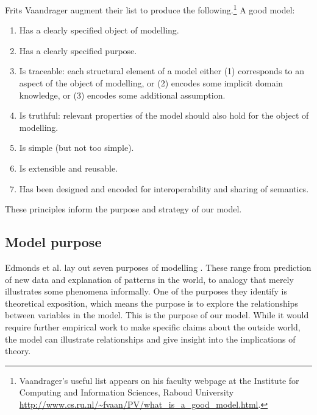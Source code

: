 Frits Vaandrager %
augment their list to produce the following.\footnote{Vaandrager's useful list appears on his faculty webpage at the Institute for Computing and Information Sciences, Raboud University \url{http://www.cs.ru.nl/~fvaan/PV/what_is_a_good_model.html}. %
} A good model: \begin{enumerate}
     \item Has a clearly specified object of modelling.
     \item Has a clearly specified purpose.
     \item Is traceable: each structural element of a model either (1) corresponds to an aspect of the object of modelling, or (2) encodes some implicit domain knowledge, or (3) encodes some additional assumption.
     \item Is truthful: relevant properties of the model should also hold for the object of modelling.
     \item Is simple (but not too simple).
     \item Is extensible and reusable.
     \item Has been designed and encoded for interoperability and sharing of semantics.
 \end{enumerate}
These principles inform the purpose and strategy of our model.

\subsection{Model purpose}

Edmonds et al. lay out seven purposes of modelling \cite{edmondsDifferentModellingPurposes2019}. These range from prediction of new data and explanation of patterns in the world, to analogy that merely illustrates some phenomena informally. %
One of the purposes they identify is \gls{theoretical exposition}, which means the purpose is to explore the relationships between variables in the model. This is the purpose of our model. %
While it would require further empirical work to make specific claims about the outside world, 
the  model can illustrate relationships and give insight into the implications of theory. 

